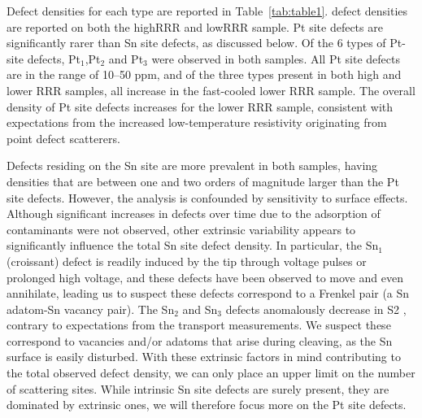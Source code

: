 \par Defect densities for each type are reported in Table~\ref{tab:table1}. defect densities are reported on both the highRRR and lowRRR sample. Pt site defects are significantly rarer than Sn site defects, as discussed below. Of the 6 types of Pt-site defects, Pt$_{1}$,Pt$_{2}$ and Pt$_{3}$ were observed in both samples. All Pt site defects are in the range of 10--50 ppm, and of the three types present in both high and lower RRR samples, all increase in the fast-cooled lower RRR sample. The overall density of Pt site defects increases for the lower RRR sample, consistent with expectations from the increased low-temperature resistivity originating from point defect scatterers.

\par Defects residing on the Sn site are more prevalent in both samples, having densities that are between one and two orders of magnitude larger than the Pt site defects. However, the analysis is confounded by sensitivity to surface effects. Although significant increases in defects over time due to the adsorption of contaminants were not observed, other extrinsic variability appears to significantly influence the total Sn site defect density. In particular, the Sn$_1$ (croissant) defect is readily induced by the tip through voltage pulses or prolonged high voltage, and these defects have been observed to move and even annihilate, leading us to suspect these defects correspond to a Frenkel pair (a Sn adatom-Sn vacancy pair). The Sn$_2$ and Sn$_3$ defects anomalously decrease in S2 , contrary to expectations from the transport measurements. We suspect these correspond to vacancies and/or adatoms that arise during cleaving, as the Sn surface is easily disturbed. With these extrinsic factors in mind contributing to the total observed defect density, we can only place an upper limit on the number of scattering sites. While intrinsic Sn site defects are surely present, they are dominated by extrinsic ones, we will therefore focus more on the Pt site defects.

